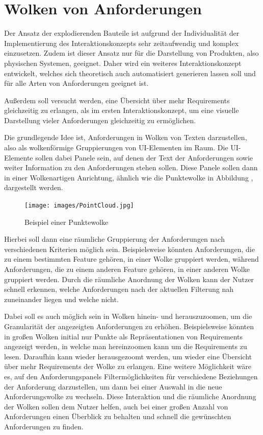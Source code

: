 \newpage
\section{Wolken von Anforderungen}

Der Ansatz der explodierenden Bauteile ist aufgrund der Individualität der Implementierung des Interaktionskonzepts sehr zeitaufwendig und komplex einzusetzen.
Zudem ist dieser Ansatz nur für die Darstellung von Produkten, also physischen Systemen, geeignet.
Daher wird ein weiteres Interaktionskonzept entwickelt, welches sich theoretisch auch automatisiert generieren lassen soll und für alle Arten von Anforderungen geeignet ist.

Außerdem soll versucht werden, eine Übersicht über mehr Requirements gleichzeitig zu erlangen, als im ersten Interaktionskonzept, um eine visuelle Darstellung vieler Anforderungen gleichzeitig zu ermöglichen.

Die grundlegende Idee ist, Anforderungen in Wolken von Texten darzustellen, also als wolkenförmige Gruppierungen von UI-Elementen im Raum.
Die UI-Elemente sollen dabei Panele sein, auf denen der Text der Anforderungen sowie weiter Information zu den Anforderungen stehen sollen.
Diese Panele sollen dann in einer Wolkenartigen Anrichtung, ähnlich wie die Punktewolke in Abbildung , dargestellt werden.

\begin{figure}[H]
    \centering
    \texttt{[image: images/PointCloud.jpg]}
    \caption{Beispiel einer Punktewolke}
    \label{fig:point-cloud}
  \end{figure}



Hierbei soll dann eine räumliche Gruppierung der Anforderungen nach verschiedenen Kriterien möglich sein.
Beispielsweise könnten Anforderungen, die zu einem bestimmten Feature gehören, in einer Wolke gruppiert werden, während Anforderungen, die zu einem anderen Feature gehören, in einer anderen Wolke gruppiert werden.
Durch die räumliche Anordnung der Wolken kann der Nutzer schnell erkennen, welche Anforderungen nach der aktuellen Filterung nah zuneinander liegen und welche nicht.

Dabei soll es auch möglich sein in Wolken hinein- und herauszuzoomen, um die Granularität der angezeigten Anforderungen zu erhöhen.
Beispielsweise könnten in großen Wolken initial nur Punkte als Repräsentationen von Requirements angezeigt werden, in welche man hereinzoomen kann um die Requirements zu lesen.
Daraufhin kann wieder herausgezoomt werden, um wieder eine Übersicht über mehr Requirements der Wolke zu erlangen.
Eine weitere Möglichkeit wäre es, auf den Anforderungspanels Filtermöglichkeiten für verschiedene Beziehungen der Anforderung darzustellen, um dann bei einer Auswahl in die neue Anforderungswolke zu wechseln.
Diese Interaktion und die räumliche Anordnung der Wolken sollen dem Nutzer helfen, auch bei einer großen Anzahl von Anforderungen einen Überblick zu behalten und schnell die gewünschten Anforderungen zu finden.

